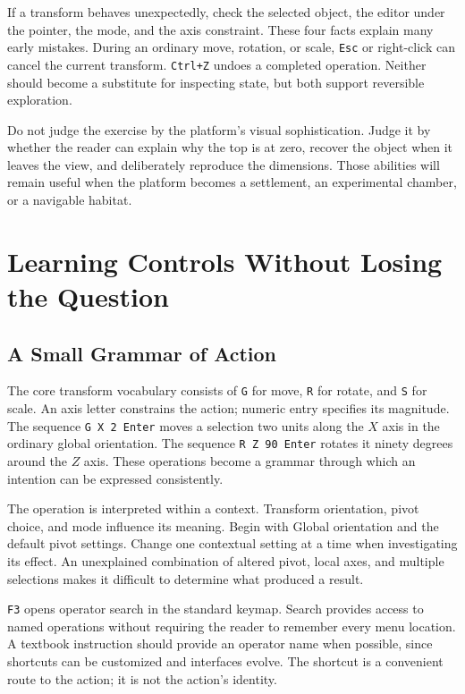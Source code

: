 \documentclass[11pt,openany]{book}
\newcommand{\key}[1]{\texttt{#1}}
\begin{document}
If a transform behaves unexpectedly, check the selected object, the editor under the pointer, the mode, and the axis constraint. These four facts explain many early mistakes. During an ordinary move, rotation, or scale, \key{Esc} or right-click can cancel the current transform. \key{Ctrl+Z} undoes a completed operation. Neither should become a substitute for inspecting state, but both support reversible exploration.

Do not judge the exercise by the platform's visual sophistication. Judge it by whether the reader can explain why the top is at zero, recover the object when it leaves the view, and deliberately reproduce the dimensions. Those abilities will remain useful when the platform becomes a settlement, an experimental chamber, or a navigable habitat.



\chapter{Learning Controls Without Losing the Question}

\section{A Small Grammar of Action}

The core transform vocabulary consists of \key{G} for move, \key{R} for rotate, and \key{S} for scale. An axis letter constrains the action; numeric entry specifies its magnitude. The sequence \texttt{G X 2 Enter} moves a selection two units along the $X$ axis in the ordinary global orientation. The sequence \texttt{R Z 90 Enter} rotates it ninety degrees around the $Z$ axis. These operations become a grammar through which an intention can be expressed consistently.

The operation is interpreted within a context. Transform orientation, pivot choice, and mode influence its meaning. Begin with Global orientation and the default pivot settings. Change one contextual setting at a time when investigating its effect. An unexplained combination of altered pivot, local axes, and multiple selections makes it difficult to determine what produced a result.

\key{F3} opens operator search in the standard keymap. Search provides access to named operations without requiring the reader to remember every menu location. A textbook instruction should provide an operator name when possible, since shortcuts can be customized and interfaces evolve. The shortcut is a convenient route to the action; it is not the action's identity.
\end{document}
